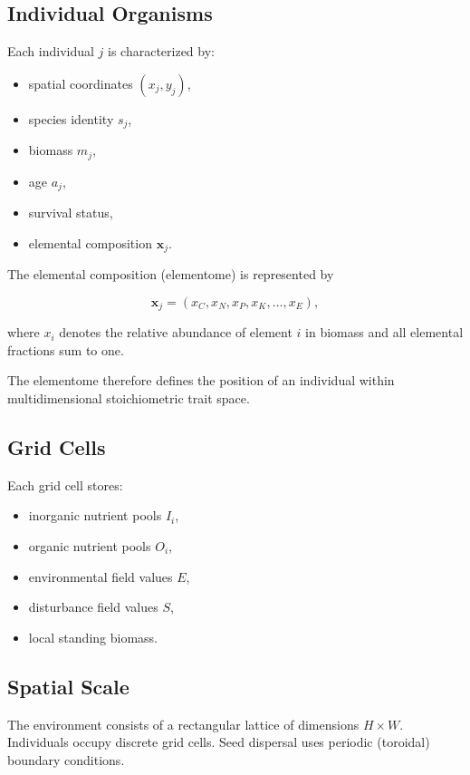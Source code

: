 \subsection{Individual Organisms}

Each individual $j$ is characterized by:

\begin{itemize}
\item spatial coordinates $(x_j,y_j)$,
\item species identity $s_j$,
\item biomass $m_j$,
\item age $a_j$,
\item survival status,
\item elemental composition $\mathbf{x}_j$.
\end{itemize}

The elemental composition (elementome) is represented by

\begin{equation}
\mathbf{x}_j=(x_C,x_N,x_P,x_K,\ldots,x_E),
\end{equation}

where $x_i$ denotes the relative abundance of element $i$ in biomass and all elemental fractions sum to one.

The elementome therefore defines the position of an individual within multidimensional stoichiometric trait space.

\subsection{Grid Cells}

Each grid cell stores:

\begin{itemize}
\item inorganic nutrient pools $I_i$,
\item organic nutrient pools $O_i$,
\item environmental field values $E$,
\item disturbance field values $S$,
\item local standing biomass.
\end{itemize}

\subsection{Spatial Scale}

The environment consists of a rectangular lattice of dimensions $H \times W$. Individuals occupy discrete grid cells. Seed dispersal uses periodic (toroidal) boundary conditions.

